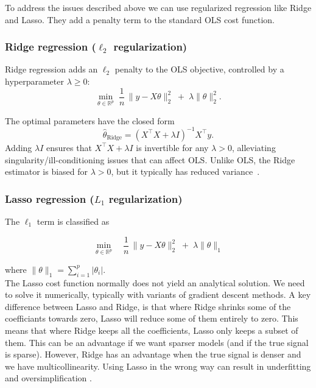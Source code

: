 \documentclass[amssymb,twocolumn,aps,floatfix]{revtex4-2}
\begin{document}
To address the issues described above we can use regularized regression like Ridge and Lasso. They add a penalty term to the standard OLS cost function. \\

\subsubsection{Ridge regression ($\ell_2$ regularization)}
\label{subsubsec:rdg_theory}

Ridge regression adds an $\ell_2$ penalty to the OLS objective, controlled by a hyperparameter $\lambda \ge 0$:
\begin{equation}
\min_{\theta \in \mathbb{R}^p}\;
\frac{1}{n}\,\lVert y - X\theta \rVert_2^2
\;+\;
\lambda \lVert \theta \rVert_2^2.
\end{equation}

The optimal parameters have the closed form
\begin{equation}
\hat{\theta}_{\text{Ridge}}
= (X^\top X + \lambda I)^{-1} X^\top y.
\end{equation}
Adding $\lambda I$ ensures that $X^\top X + \lambda I$ is invertible for any $\lambda>0$, alleviating singularity/ill-conditioning issues that can affect OLS. Unlike OLS, the Ridge estimator is biased for $\lambda>0$, but it typically has reduced variance~\cite{hj_week36}.


\subsubsection{Lasso regression ($L_1$ regularization)}
\label{subsubsec:lasso_theory}

The $\ell_1$ term is classified as 

\begin{equation}
\min_{\theta \in \mathbb{R}^p}
\quad
\frac{1}{n}\,\lVert y - X\theta \rVert_2^2
\;+\;
\lambda \lVert \theta \rVert_1
\end{equation}

where $\lVert \theta \rVert_1 = \sum_{i=1}^p \lvert \theta_i \rvert$. \\

The Lasso cost function normally does not yield an analytical solution. We need to solve it numerically, typically with variants of gradient descent methods. A key difference between Lasso and Ridge, is that where Ridge shrinks some of the coefficiants towards zero, Lasso will reduce some of them entirely to zero. This means that where Ridge keeps all the coefficients, Lasso only keeps a subset of them. This can be an advantage if we want sparser models (and if the true signal is sparse). However, Ridge has an advantage when the true signal is denser and we have multicollinearity. Using Lasso in the wrong way can result in underfitting and oversimplification \cite{hj_week36}. 
\end{document}
